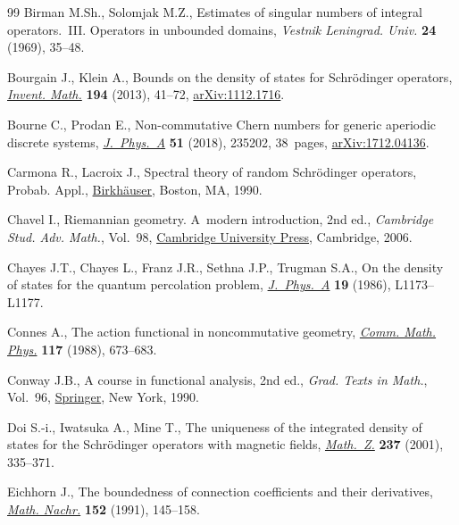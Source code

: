 \documentclass[pdftex]{sigma}
\numberwithin{equation}{section}
\begin{document}
\begin{thebibliography}{99}
Birman M.Sh., Solomjak M.Z., Estimates of singular numbers of integral
 operators.~{III}. {O}perators in unbounded domains, \textit{Vestnik
 Leningrad. Univ.} \textbf{24} (1969), 35--48.

Bourgain J., Klein A., Bounds on the density of states for {S}chr\"odinger
 operators, \href{https://doi.org/10.1007/s00222-012-0440-1}{\textit{Invent. Math.}} \textbf{194} (2013), 41--72,
 \href{https://arxiv.org/abs/1112.1716}{arXiv:1112.1716}.

Bourne C., Prodan E., Non-commutative {C}hern numbers for generic aperiodic
 discrete systems, \href{https://doi.org/10.1088/1751-8121/aac093}{\textit{J.~Phys.~A}} \textbf{51} (2018), 235202, 38~pages,
 \href{https://arxiv.org/abs/1712.04136}{arXiv:1712.04136}.

Carmona R., Lacroix J., Spectral theory of random {S}chr\"odinger operators,
 Probab. Appl., \href{https://doi.org/10.1007/978-1-4612-4488-2}{Birkh\"auser}, Boston, MA, 1990.

Chavel I., Riemannian geometry. {A}~modern introduction, 2nd ed., \textit{Cambridge
 Stud. Adv. Math.}, Vol.~98, \href{https://doi.org/10.1017/CBO9780511616822}{Cambridge University Press}, Cambridge,
 2006.

Chayes J.T., Chayes L., Franz J.R., Sethna J.P., Trugman S.A., On the density
 of states for the quantum percolation problem, \href{https://doi.org/10.1088/0305-4470/19/18/011}{\textit{J.~Phys.~A}}
 \textbf{19} (1986), L1173--L1177.

Connes A., The action functional in noncommutative geometry, \href{https://doi.org/10.1007/BF01218391}{\textit{Comm.
 Math. Phys.}} \textbf{117} (1988), 673--683.

Conway J.B., A course in functional analysis, 2nd ed., \textit{Grad. Texts in Math.},
 Vol.~96, \href{https://doi.org/10.1007/978-1-4757-3828-5}{Springer}, New York, 1990.

Doi S.-i., Iwatsuka A., Mine T., The uniqueness of the integrated density of
 states for the {S}chr\"odinger operators with magnetic fields,
 \href{https://doi.org/10.1007/PL00004872}{\textit{Math.~Z.}} \textbf{237} (2001), 335--371.

Eichhorn J., The boundedness of connection coefficients and their derivatives,
 \href{https://doi.org/10.1002/mana.19911520113}{\textit{Math. Nachr.}} \textbf{152} (1991), 145--158.


\end{thebibliography}
\end{document}
